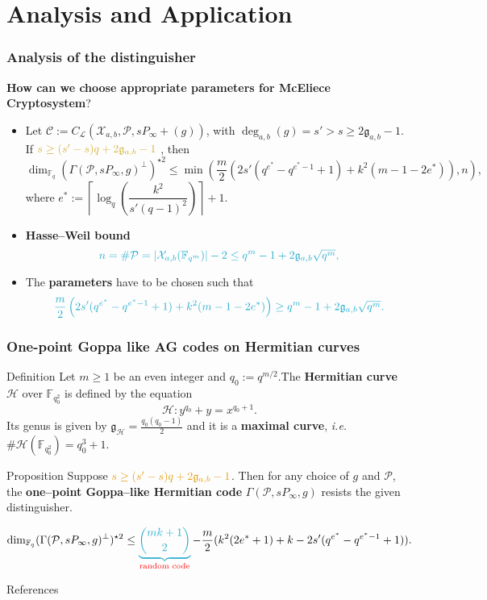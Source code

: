 \documentclass[
10pt, %
%
aspectratio=169, %
]{beamer}
\theoremstyle{plain}%
\theoremstyle{definition}
\theoremstyle{remark}
\newcommand{\calP}{\mathcal{P}}
\newcommand{\calH}{\mathcal{H}}
\newcommand{\calL}{\mathcal{L}}
\newcommand{\calC}{\mathcal{C}}
\newcommand{\calX}{\mathcal{X}}
\newcommand{\fqm}{\mathbb{F}_{q^m}}
\newcommand{\fq}{\mathbb{F}_{q}}
\newcommand{\fqo}{\mathbb{F}_{q_0^2}}
\newcommand{\degab}[1]{\deg_{a,b}\left(#1\right)}
\begin{document}
\section{Analysis and Application}
\begin{frame}
	\frametitle{Analysis of the distinguisher}
	\textcolor{applegreen}{\textbf{How can we choose appropriate parameters for McEliece Cryptosystem}?}
	\begin{itemize}
		\item Let $\calC := C_\calL(\calX_{a,b},\calP,sP_\infty +(g))$, with $\degab{g} = s'>s\geq 2\mathfrak{g}_{a,b}-1$. If $\mathcolor{gold}{s \geq (s'-s)q+2\mathfrak{g}_{a,b}-1}$ , then
		\[ \dim_{\fq} (\Gamma(\calP,sP_\infty,g)^{\perp})^{\star 2} \leq \min \left(\frac{m}{2}\left(2s'(q^{e^*}-q^{e^*-1}+1)+k^2(m-1-2e^*)  \right),n\right),\]	
		where $e^* := \left\lceil \log_q\left(\dfrac{k^2}{s'(q-1)^2}\right)\right\rceil+1$.
		\item \textbf{Hasse--Weil bound }
		\[\color{ballblue}{n = \# \calP = |\calX_{a,b}(\fqm)|-2 \leq q^m-1+2\mathfrak{g}_{a,b}\sqrt{q^m}},\]
		\item The \textbf{parameters} have to be chosen such that 
		\[\color{ballblue}{\frac{m}{2}\left(2s'(q^{e^*}-q^{e^*-1}+1)+k^2(m-1-2e^*)  \right)\geq q^m-1+2\mathfrak{g}_{a,b}\sqrt{q^m}}.\]	
		
	\end{itemize}
\end{frame}
\begin{frame}
	\frametitle{One-point Goppa like AG codes on Hermitian curves}
	\begin{block}{Definition }
		Let $m \geq 1$ be an even integer and $q_0 := q^{m/2}$.The \textbf{Hermitian curve} $\calH$ over $\fqo$ is defined by the equation
		\[\calH : y^{q_0}+y = x^{q_0+1}.\]
		Its genus is given by $\mathfrak{g}_{\calH} = \frac{q_0(q_0-1)}{2}$ and it is a \textbf{maximal curve}, \emph{i.e.} $\#\calH(\fqo) = q_0^3+1$.
	\end{block}
	
	\begin{block}{Proposition \cite{lhotel2023goppa}} 
		Suppose $\mathcolor{gamboge}{s \geq (s'-s)q+2\mathfrak{g}_{a,b}-1}$. Then for any choice of $g$ and $\calP$, the \textbf{one--point Goppa--like Hermitian code} $\Gamma(\calP,sP_\infty,g)$ resists the given distinguisher.
	\end{block}
\begin{tcolorbox}[colback=aliceblue]
	$$\dim_{\fq} (\Gamma(\calP,sP_\infty,g)^{\perp})^{\star 2}\leq \mathcolor{ballblue}{\underbrace{\binom{mk+1}{2}}}_{\text{\textcolor{red}{random code}}} - \dfrac{m}{2}(k^2(2e^*+1)+k-2s'(q^{e^*}-q^{e^*-1}+1)). $$
\end{tcolorbox}
\end{frame}
	\begin{frame}[allowframebreaks]{References}
		
		
		
		
	\end{frame}
	
\end{document}
